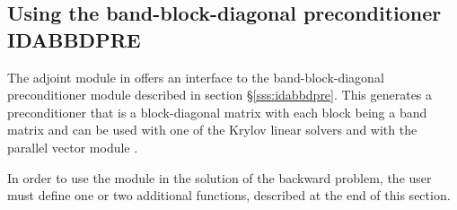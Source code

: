 \subsection{Using the band-block-diagonal preconditioner IDABBDPRE}

The adjoint module in {\idas} offers an interface to the band-block-diagonal
preconditioner module {\idabbdpre} described in section \S\ref{sss:idabbdpre}.
This generates a preconditioner that is a block-diagonal matrix with each
block being a band matrix and can be used with one of the Krylov linear solvers
and with the parallel vector module {\nvecp}.

In order to use the {\idabbdpre} module in the solution of the backward problem,
the user must define one or two additional functions, described at the end of this section. 

